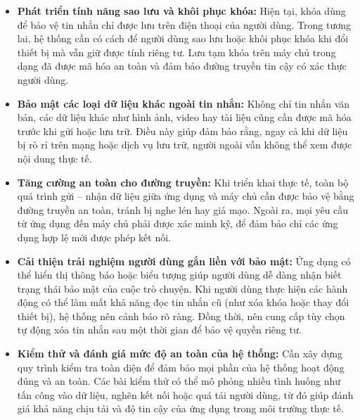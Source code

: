\begin{itemize}
  \item \textbf{Phát triển tính năng sao lưu và khôi phục khóa: } Hiện tại, khóa dùng để bảo vệ tin nhắn chỉ được lưu trên điện thoại của người dùng. Trong tương lai, hệ thống cần có cách để người dùng sao lưu hoặc khôi phục khóa khi đổi thiết bị mà vẫn giữ được tính riêng tư. Lưu tạm khóa trên máy chủ trong dạng đã được mã hóa an toàn và đảm bảo đường truyền tin cậy có xác thực người dùng.
  \item \textbf{Bảo mật các loại dữ liệu khác ngoài tin nhắn:} Không chỉ tin nhắn văn bản, các dữ liệu khác như hình ảnh, video hay tài liệu cũng cần được mã hóa trước khi gửi hoặc lưu trữ. Điều này giúp đảm bảo rằng, ngay cả khi dữ liệu bị rò rỉ trên mạng hoặc dịch vụ lưu trữ, người ngoài vẫn không thể xem được nội dung thực tế.
  \item \textbf{Tăng cường an toàn cho đường truyền: } Khi triển khai thực tế, toàn bộ quá trình gửi – nhận dữ liệu giữa ứng dụng và máy chủ cần được bảo vệ bằng đường truyền an toàn, tránh bị nghe lén hay giả mạo. Ngoài ra, mọi yêu cầu từ ứng dụng đến máy chủ phải được xác minh kỹ, để đảm bảo chỉ các ứng dụng hợp lệ mới được phép kết nối.
  \item \textbf{Cải thiện trải nghiệm người dùng gắn liền với bảo mật: } Ứng dụng có thể hiển thị thông báo hoặc biểu tượng giúp người dùng dễ dàng nhận biết trạng thái bảo mật của cuộc trò chuyện. Khi người dùng thực hiện các hành động có thể làm mất khả năng đọc tin nhắn cũ (như xóa khóa hoặc thay đổi thiết bị), hệ thống nên cảnh báo rõ ràng. Đồng thời, nên cung cấp tùy chọn tự động xóa tin nhắn sau một thời gian để bảo vệ quyền riêng tư.
  \item \textbf{Kiểm thử và đánh giá mức độ an toàn của hệ thống: } Cần xây dựng quy trình kiểm tra toàn diện để đảm bảo mọi phần của hệ thống hoạt động đúng và an toàn. Các bài kiểm thử có thể mô phỏng nhiều tình huống như tấn công vào dữ liệu, nghẽn kết nối hoặc quá tải người dùng, từ đó giúp đánh giá khả năng chịu tải và độ tin cậy của ứng dụng trong môi trường thực tế.
\end{itemize}
